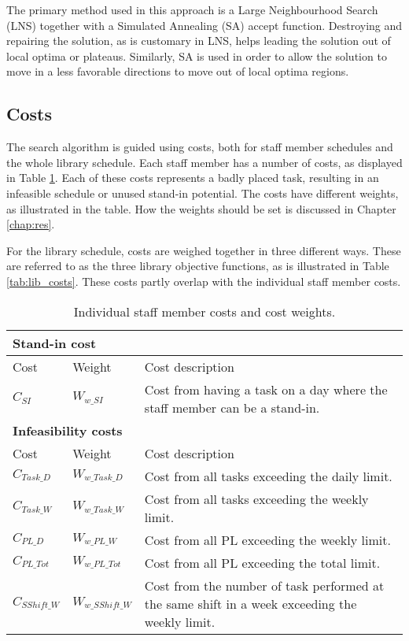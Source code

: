 The primary method used in this approach is a Large Neighbourhood Search (LNS) together with a Simulated Annealing (SA) accept function. Destroying and repairing the solution, as is customary in LNS, helps leading the solution out of local optima or plateaus. Similarly, SA is used in order to allow the solution to move in a less favorable directions to move out of local optima regions.

\subsection{Costs} \label{subsection:tasks_cost}
The search algorithm is guided using costs, both for staff member schedules and the whole library schedule. Each staff member has a number of costs, as displayed in Table \ref{tab:staff member_costs}. Each of these costs represents a badly placed task, resulting in an infeasible schedule or unused stand-in potential. The costs have different weights, as illustrated in the table. How the weights should be set is discussed in Chapter \ref{chap:res}. 

For the library schedule, costs are weighed together in three different ways. These are referred to as the three library objective functions, as is illustrated in Table \ref{tab:lib_costs}. These costs partly overlap with the individual staff member costs.

\begin{table}[!h]
\centering
\caption{Individual staff member costs and cost weights.}
\label{tab:staff member_costs}
\begin{tabular}{|l|l|p{7cm}|}
\hline
\multicolumn{3}{|l|}{\cellcolor{gray!90} \textbf{Stand-in cost}} \\ \hline
\rowcolor{Gray} Cost & Weight & Cost description \\ \hline
$C_{SI}$ & $W_{w\_SI}$ & Cost from having a task on a day where the staff member can be a stand-in. \\ \hline
\multicolumn{3}{|l|}{\cellcolor{gray!90} \textbf{Infeasibility costs}} \\ \hline
\rowcolor{Gray} Cost & Weight & Cost description \\ \hline
$C_{Task\_D}$ & $W_{w\_Task\_D}$ & Cost from all tasks exceeding the daily limit. \\ \hline
$C_{Task\_W}$ & $W_{w\_Task\_W}$ & Cost from all tasks exceeding the weekly limit.  \\ \hline
$C_{PL\_D}$ & $W_{w\_PL\_W}$ & Cost from all PL exceeding the weekly limit. \\ \hline
$C_{PL\_Tot}$ & $W_{w\_PL\_Tot}$ & Cost from all PL exceeding the total limit. \\ \hline
$C_{SShift\_W}$ & $W_{w\_SShift\_W}$ & Cost from the number of task performed at the same shift in a week exceeding the weekly limit. \\ \hline
\end{tabular}
\end{table}

